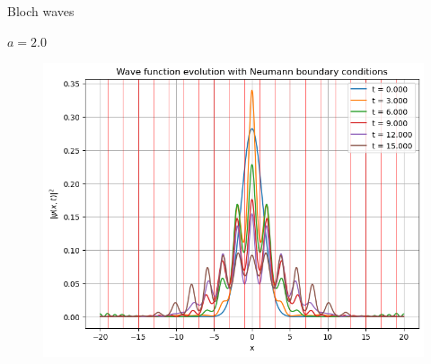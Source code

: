 \begin{frame}{Bloch waves}
\begin{minipage}{0.32\textwidth}
\begin{figure}
        \end{figure}
    \end{minipage}
    \hfill
    \begin{minipage}{0.32\textwidth}
        \begin{center}
            $a=2.0$
        \end{center}
        \vspace{-0.25cm}
        \begin{figure}
            \centering
            \includegraphics[width=\textwidth]{Immagini/plot-periodic-potential-a-2.png}
        \end{figure}
    \end{minipage}
\end{frame}

